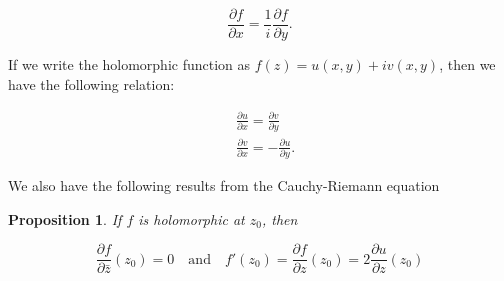 \documentclass{article}
\newtheorem{proposition}{Proposition}
\begin{document}
\begin{equation} \label{Cauchy_Riemann}
\frac{\partial f}{\partial x}=\frac{1}{i}\frac{\partial f}{\partial y}.
\end{equation}

If we write the holomorphic function as $f(z)=u(x,y)+iv(x,y)$, then we have the following relation:

\begin{equation} \label{Cauchy_Riemann_2}
\begin{aligned}
&\frac{\partial u}{\partial x}=\frac{\partial v}{\partial y}\\
&\frac{\partial v}{\partial x}=-\frac{\partial u}{\partial y}.
\end{aligned}
\end{equation}

We also have the following results from the Cauchy-Riemann equation

\begin{proposition}
If $f$ is holomorphic at $z_0$, then 

\begin{equation}
\frac{\partial f}{\partial\bar{z}}(z_0)=0 \quad \text{and} \quad f'(z_0)=\frac{\partial f}{\partial z}(z_0)=2\frac{\partial u}{\partial z}(z_0)
\end{equation}

\end{proposition}
\end{document}
